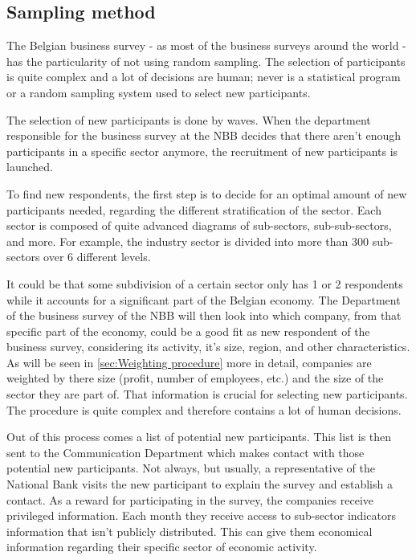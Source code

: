 \documentclass[12pt,a4paper,oneside]{book}
\begin{document}
\subsection{Sampling method}
\label{sec:Recruitment of participants}

The Belgian business survey - as most of the business surveys around the world - has the particularity of not using random sampling. 
The selection of participants is quite complex and a lot of decisions are human; never is a statistical program or a random sampling system used to select new participants.

The selection of new participants is done by waves. When the department responsible for the business survey at the NBB decides that there aren't enough participants in a specific sector anymore, the recruitment of new participants is launched.

To find new respondents, the first step is to decide for an optimal amount of new participants needed, regarding the different stratification of the sector.
Each sector is composed of quite advanced diagrams of sub-sectors, sub-sub-sectors, and more. For example, the industry sector is divided into more than 300 sub-sectors over 6 different levels. 

It could be that some subdivision of a certain sector only has 1 or 2 respondents while it accounts for a significant part of the Belgian economy. The Department of the business survey of the NBB will then look into which company, from that specific part of the economy, could be a good fit as new respondent of the business survey, considering its activity, it's size, region, and other characteristics.
As will be seen in \autoref{sec:Weighting procedure} more in detail, companies are weighted by there size (profit, number of employees, etc.) and the size of the sector they are part of. That information is crucial for selecting new participants.
The procedure is quite complex and therefore contains a lot of human decisions.
 
Out of this process comes a list of potential new participants. This list is then sent to the Communication Department which makes contact with those potential new participants. 
Not always, but usually, a representative of the National Bank visits the new participant to explain the survey and establish a contact.
As a reward for participating in the survey, the companies receive privileged information. Each month they receive access to sub-sector indicators information that isn't publicly distributed. This can give them economical information regarding their specific sector of economic activity.
\end{document}
